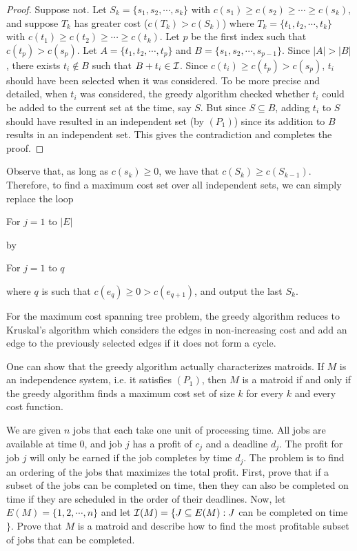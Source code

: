 \documentclass[12pt]{article}
\begin{document}
\begin{proof}
Suppose not. Let $S_k=\{s_1, s_2, \cdots, s_k\}$ with $c(s_1)\geq
c(s_2)\geq \cdots \geq c(s_k)$, and suppose $T_k$ has greater cost
($c(T_k)>c(S_k)$) where $T_k=\{t_1, t_2, \cdots, t_k\}$ with
$c(t_1)\geq c(t_2)\geq \cdots \geq c(t_k)$. Let $p$ be the first index
such that $c(t_p)>c(s_p)$. Let $A=\{t_1, t_2, \cdots, t_p\}$ and
$B=\{s_1, s_2, \cdots, s_{p-1}\}$. Since $|A|>|B|$, there exists
$t_i\notin B$ such that $B+t_i\in {\cal I}$. Since $c(t_i)\geq
c(t_p)>c(s_p)$, $t_i$ should have been selected when it was
considered. To be more precise and detailed, when $t_i$ was
considered, the greedy algorithm checked whether $t_i$ could be added
to the current set at the time, say $S$. But since $S\subseteq B$,
adding $t_i$ to $S$ should have resulted in an independent set (by
$(P_1)$) since its addition to $B$ results in an independent set. This
gives the contradiction and completes the proof.
\end{proof}

Observe that, as long as $c(s_k)\geq 0$, we have that $c(S_k)\geq
c(S_{k-1})$. Therefore, to find a maximum cost set over all
independent sets, we can simply replace the loop
\begin{pseudocode}
\item For $j=1$ to $|E|$
\end{pseudocode}
by  
\begin{pseudocode}
\item For $j=1$ to $q$
\end{pseudocode}
where $q$ is such that $c(e_q)\geq 0 >c(e_{q+1})$, and output
the last $S_k$. 

For the maximum cost spanning tree problem, the greedy algorithm
reduces to Kruskal's algorithm which considers the edges in
non-increasing cost and add an edge to the previously selected edges
if it does not form a cycle. 

One can show that the greedy algorithm actually characterizes
matroids. If $M$ is an independence system, i.e. it satisfies $(P_1)$,
then $M$ is a matroid if and only if the greedy algorithm finds a
maximum cost set of size $k$ for every $k$ and every cost function. 

\begin{exercises}
\item
We are given $n$ jobs that each take one unit of
processing time. All jobs are available at time 0, and job $j$ has a
profit of $c_j$ and a deadline $d_j$. The profit for job $j$ will only
be earned if the job completes by time $d_j$. The problem is to find
an ordering of the jobs that maximizes the total profit. First, prove
that if a subset of the jobs can be completed on time, then they can
also be completed on time if they are scheduled in the order of their
deadlines. Now, let $E(M)=\{1,2,\cdots,n\}$ and let ${\cal
I}(M)=\{J\subseteq E(M): J$ can be completed on time $\}$. Prove that
$M$ is a matroid and describe how to find the most profitable subset of jobs that can be completed.
\end{exercises}
\end{document}
